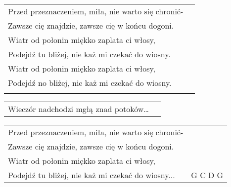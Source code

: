 \documentclass[a5paper]{article}
\begin{document}
\noindent
\begin{tabular}{@{}p{8.50cm}p{3cm}@{}}
Przed przeznaczeniem, miła, nie warto się chronić- \\
Zawsze cię znajdzie, zawsze cię w końcu dogoni. \\
Wiatr od połonin miękko zaplata ci włosy, \\
Podejdź tu bliżej, nie każ mi czekać do wiosny. \\ 
Wiatr od połonin miękko zaplata ci włosy, \\
Podejdź no bliżej, nie każ mi czekać do wiosny. \\ \\
\end{tabular}

\noindent
\begin{tabular}{@{}p{7.50cm}p{3cm}@{}}
Wieczór nadchodzi mgłą znad potoków… \\
\end{tabular}

\noindent
\begin{tabular}{@{}p{8.50cm}p{3cm}@{}}
Przed przeznaczeniem, miła, nie warto się chronić- \\
Zawsze cię znajdzie, zawsze cię w końcu dogoni. \\
Wiatr od połonin miękko zaplata ci włosy, \\
Podejdź tu bliżej, nie każ mi czekać do wiosny... & G C D G\\ 
\end{tabular}
\end{document}
